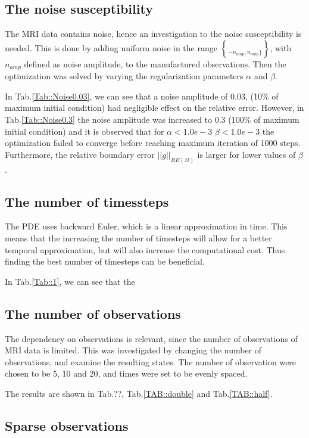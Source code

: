\documentclass[11pt,a4paper]{article}
\begin{document}
\subsection{The noise susceptibility}

The MRI data contains noise, hence an investigation to the noise susceptibility is needed. This is done by adding uniform noise in the range $\brace -n_{amp} , n_{amp} \rbrace $, with $n_{amp}$ defined as noise amplitude, to the manufactured observations. Then the optimization was solved by varying the regularization parameters $\alpha$ and $\beta$. 

In Tab.\ref{Tab::Noise0.03}, we can see that a noise amplitude of 0.03, (10$\%$ of maximum initial condition) had negligible effect on the relative error. However, in Tab.\ref{Tab::Noise0.3} the noise amplitude was increased to 0.3 (100$\%$ of maximum initial condition) and it is observed that for  $\alpha < 1.0e-3$  $\beta < 1.0e-3$ the optimization failed to converge before reaching maximum iteration of 1000 steps. Furthermore, the relative boundary error $||g||_{RE(\Omega)}$ is  larger for lower values of $\beta$. 


\subsection{The number of timessteps}

The PDE uses backward Euler, which is a linear approximation in time. This means that the increasing the number of timesteps will allow for a better temporal approximation, but will also increase the computational cost. Thus finding the best number of timesteps can be beneficial.

In Tab.\ref{Tab::1}, we can see that the 

\subsection{The number of observations}

The dependency on observations is relevant, since the number of observations of MRI data is limited. This was investigated by changing the number of observations, and examine the resulting states. The number of observation were chosen to be 5, 10  and 20, and times were set to be evenly spaced. 

The results are shown in Tab.??, Tab.\ref{TAB::double} and Tab.\ref{TAB::half}. 
\subsection{Sparse observations}
\end{document}
